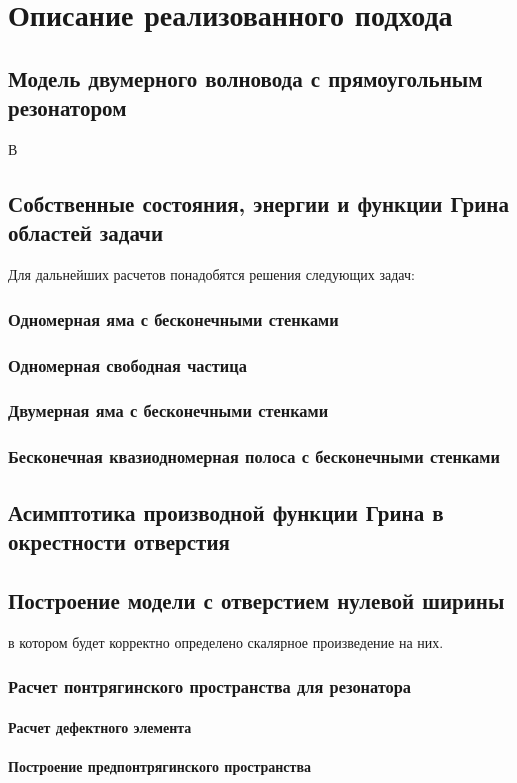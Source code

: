 \chapter{Описание реализованного подхода}
\label{chapter2}

\section{Модель двумерного волновода с прямоугольным резонатором}
В

\section{Собственные состояния, энергии и функции Грина областей задачи}
Для дальнейших расчетов понадобятся решения следующих задач:

\subsection{Одномерная яма с бесконечными стенками}


\subsection{Одномерная свободная частица}


\subsection{Двумерная яма с бесконечными стенками}

\subsection{Бесконечная квазиодномерная полоса с бесконечными стенками}


\section{Асимптотика производной функции Грина в окрестности отверстия}


\section{Построение модели с отверстием нулевой ширины}
 в котором будет корректно определено скалярное произведение на них.

\subsection{Расчет понтрягинского пространства для резонатора}
\subsubsection{Расчет дефектного элемента}

\subsubsection{Построение предпонтрягинского пространства}
